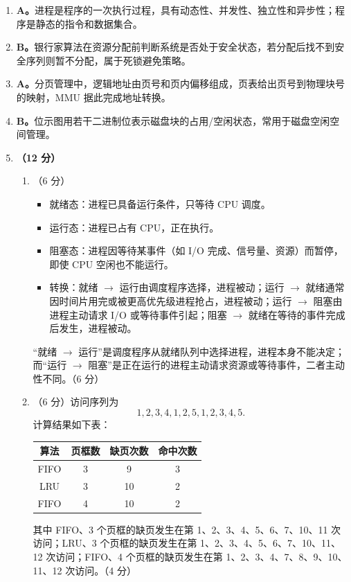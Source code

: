 \documentclass[a4paper,11pt]{article}
\begin{document}
\begin{enumerate}[start=8, label=\textbf{\arabic*.}, leftmargin=2.4em, itemsep=0.45em]

\item \textbf{A。}进程是程序的一次执行过程，具有动态性、并发性、独立性和异步性；程序是静态的指令和数据集合。

\item \textbf{B。}银行家算法在资源分配前判断系统是否处于安全状态，若分配后找不到安全序列则暂不分配，属于死锁避免策略。

\item \textbf{A。}分页管理中，逻辑地址由页号和页内偏移组成，页表给出页号到物理块号的映射，MMU 据此完成地址转换。

\item \textbf{B。}位示图用若干二进制位表示磁盘块的占用/空闲状态，常用于磁盘空闲空间管理。

\item \textbf{（12 分）}
\begin{enumerate}[label=（\arabic*）, leftmargin=2.2em, itemsep=2pt]
  \item （6 分）
  \begin{itemize}[leftmargin=1.8em, itemsep=1pt]
    \item 就绪态：进程已具备运行条件，只等待 CPU 调度。
    \item 运行态：进程已占有 CPU，正在执行。
    \item 阻塞态：进程因等待某事件（如 I/O 完成、信号量、资源）而暂停，即使 CPU 空闲也不能运行。
    \item 转换：就绪 $\to$ 运行由调度程序选择，进程被动；运行 $\to$ 就绪通常因时间片用完或被更高优先级进程抢占，进程被动；运行 $\to$ 阻塞由进程主动请求 I/O 或等待事件引起；阻塞 $\to$ 就绪在等待的事件完成后发生，进程被动。
  \end{itemize}
  “就绪 $\to$ 运行”是调度程序从就绪队列中选择进程，进程本身不能决定；而“运行 $\to$ 阻塞”是正在运行的进程主动请求资源或等待事件，二者主动性不同。\hfill（6 分）

  \item （6 分）访问序列为
  \[
  1,2,3,4,1,2,5,1,2,3,4,5.
  \]
  计算结果如下表：
  \begin{center}\small
  \begin{tabular}{cccc}
  \toprule
  算法 & 页框数 & 缺页次数 & 命中次数 \\
  \midrule
  FIFO & 3 & 9 & 3 \\
  LRU & 3 & 10 & 2 \\
  FIFO & 4 & 10 & 2 \\
  \bottomrule
  \end{tabular}
  \end{center}
  其中 FIFO、3 个页框的缺页发生在第 1、2、3、4、5、6、7、10、11 次访问；LRU、3 个页框的缺页发生在第 1、2、3、4、5、6、7、10、11、12 次访问；FIFO、4 个页框的缺页发生在第 1、2、3、4、7、8、9、10、11、12 次访问。\hfill（4 分）


\end{enumerate}
\end{enumerate}
\end{document}

